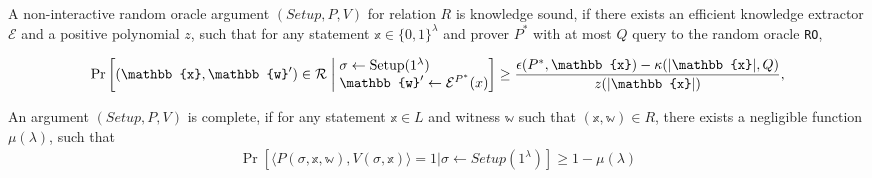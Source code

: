 \begin{definition}
    A non-interactive random oracle argument $(Setup, P, V)$ for relation $R$ is knowledge sound, if there exists an efficient knowledge extractor $\mathcal{E}$ and a positive polynomial $z$, such that for any statement $\mathbb{x}\in\{0,1\}^\lambda$ and prover $P^*$ with at most $Q$ query to the random oracle \texttt{RO},


    \begin{align*}
        \Pr \left[ (\mathbb{x},\mathbb{w}') \in \mathcal{R} \;\middle|\;
        \begin{array}{@{}l@{}} %
            \sigma \leftarrow \text{Setup}(1^\lambda) \\
            \mathbb{w}' \leftarrow \mathcal{E}^{P^*}(x)
        \end{array}
        \right]
        \geq \frac{\epsilon(P^*, \mathbb{x}) - \kappa(|\mathbb{x}|, Q)}{z(|\mathbb{x}|)},
    \end{align*}
\end{definition}

\begin{definition}[Completeness]
    An argument $(Setup, P, V)$ is complete, if for any statement $\mathbb{x}\in L$ and witness $\mathbb{w}$ such that $(\mathbb{x,w})\in R$, there exists a negligible function $\mu(\lambda)$, such that
    \begin{align*}
        \Pr\left[\langle P(\sigma,\mathbb{x},\mathbb{w}), V(\sigma,\mathbb{x})\rangle=1|\sigma\gets Setup(1^\lambda)\right]\geq 1-\mu(\lambda)
    \end{align*}
\end{definition}

